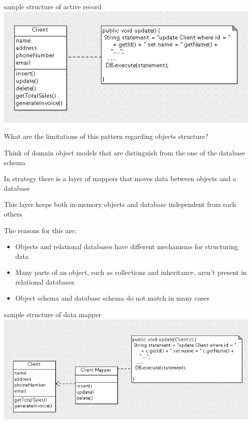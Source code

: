\documentclass{beamer}
\begin{document}
\begin{slide}{
\item sample structure of active record 
\\
\includegraphics[scale=0.3]{img/activeRecordSketch.png}
}\end{slide}


\begin{slide}{
\item What are the limitations of this pattern regarding objects structure? 
\pause
\item Think of domain object models that are distinguish from the one of the database schema
}\end{slide}


\begin{slide}{
\item In strategy there is a layer of mappers that moves data between objects and a database 
\item This layer keeps both in-memory objects and database independent from each others 
\item The reasons for this are:
\pause
\begin{itemize}
\item Objects and relational databases have different mechanisms for structuring data
\pause
\item Many parts of an object, such as collections and inheritance, aren't present in relational databases
\item Object schema and database schema do not match in many cases
\end{itemize}
}\end{slide}


\begin{slide}{
\item sample structure of data mapper 
\\
\includegraphics[scale=0.4]{img/databaseMapperSketch.png}
}\end{slide}
\end{document}
